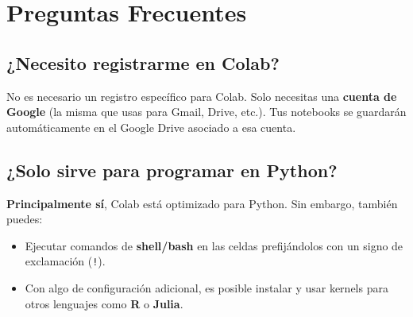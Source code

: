 \documentclass[12pt, a4paper]{article}
\begin{document}
\section{Preguntas Frecuentes}

\subsection{¿Necesito registrarme en Colab?}
No es necesario un registro específico para Colab. Solo necesitas una \textbf{cuenta de Google} (la misma que usas para Gmail, Drive, etc.). Tus notebooks se guardarán automáticamente en el Google Drive asociado a esa cuenta.

\subsection{¿Solo sirve para programar en Python?}
\textbf{Principalmente sí}, Colab está optimizado para Python. Sin embargo, también puedes:
\begin{itemize}
    \item Ejecutar comandos de \textbf{shell/bash} en las celdas prefijándolos con un signo de exclamación (\texttt{!}).
    \item Con algo de configuración adicional, es posible instalar y usar kernels para otros lenguajes como \textbf{R} o \textbf{Julia}.
\end{itemize}
\end{document}
